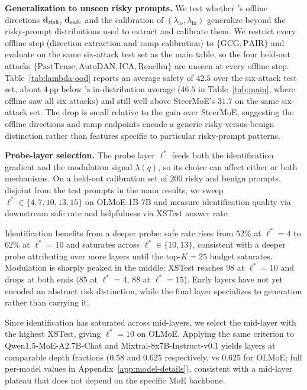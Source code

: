\begin{table}
\vspace{-1em}

\vspace{-1em}
\end{table}

\noindent\textbf{Generalization to unseen risky prompts.}
We test whether \name's offline directions $\mathbf{d}_{\text{risk}}$, $\mathbf{d}_{\text{safe}}$ and the calibration of $(\lambda_{\text{lo}}, \lambda_{\text{hi}})$ generalize beyond the risky-prompt distributions used to extract and calibrate them. We restrict every offline step (direction extraction and ramp calibration) to $\{\text{GCG}, \text{PAIR}\}$ and evaluate on the same six-attack test set as the main table, so the four held-out attacks $\{\text{PastTense}, \text{AutoDAN}, \text{ICA}, \text{Renellm}\}$ are unseen at every offline step. Table~\ref{tab:lambda-ood} reports an average safety of $42.5$ over the six-attack test set, about $4$\,pp below \name's in-distribution average ($46.5$ in Table~\ref{tab:main}, where offline saw all six attacks) and still well above SteerMoE's $31.7$ on the same six-attack set. The drop is small relative to the gain over SteerMoE, suggesting the offline directions and ramp endpoints encode a generic risky-versus-benign distinction rather than features specific to particular risky-prompt patterns.

\noindent\textbf{Probe-layer selection.}\label{sec:probe-ablation}
The probe layer $\ell^*$ feeds both the identification gradient and the modulation signal $\lambda(q)$, so its choice can affect either or both mechanisms. On a held-out calibration set of $200$ risky and benign prompts, disjoint from the test prompts in the main results, we sweep $\ell^* \in \{4, 7, 10, 13, 15\}$ on OLMoE-1B-7B and measure identification quality via downstream safe rate and helpfulness via XSTest answer rate.

Identification benefits from a deeper probe: safe rate rises from $52\%$ at $\ell^* = 4$ to $62\%$ at $\ell^* = 10$ and saturates across $\ell^* \in \{10, 13\}$, consistent with a deeper probe attributing over more layers until the top-$K{=}25$ budget saturates. Modulation is sharply peaked in the middle: XSTest reaches $98$ at $\ell^* = 10$ and drops at both ends ($85$ at $\ell^* = 4$, $88$ at $\ell^* = 15$). Early layers have not yet encoded an abstract risk distinction, while the final layer specializes to generation rather than carrying it.

Since identification has saturated across mid-layers, we select the mid-layer with the highest XSTest, giving $\ell^* = 10$ on OLMoE. Applying the same criterion to Qwen1.5-MoE-A2.7B-Chat and Mixtral-8x7B-Instruct-v0.1 yields layers at comparable depth fractions ($0.58$ and $0.625$ respectively, vs $0.625$ for OLMoE; full per-model values in Appendix~\ref{app:model-details}), consistent with a mid-layer plateau that does not depend on the specific MoE backbone.

